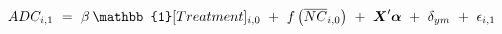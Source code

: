 \begin{equation}
\begin{split}
    ADC_{i, 1} \ 
    & = \ \beta \hspace{0.07cm} \mathbb{1}[Treatment]_{i, 0} \ + \ f\left( \overline{NC}_{i, 0} \right) \ + \ \boldsymbol{X}'\boldsymbol{\alpha} \ + \ \delta_{ym} \ + \ \epsilon_{i, 1}
\end{split}
\label{Eq:RD-Econometric-Model}
\end{equation}
